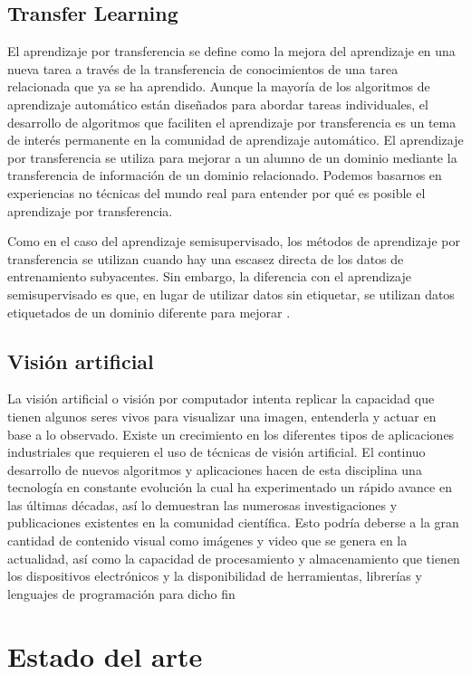 \section{Transfer Learning}
El aprendizaje por transferencia se define como la mejora del aprendizaje en una nueva tarea a través de la transferencia de conocimientos de una tarea relacionada que ya se ha aprendido. Aunque la mayoría de los algoritmos de aprendizaje automático están diseñados para abordar tareas individuales, el desarrollo de algoritmos que faciliten el aprendizaje por transferencia es un tema de interés permanente en la comunidad de aprendizaje automático. El aprendizaje por transferencia se utiliza para mejorar a un alumno de un dominio mediante la transferencia de información de un dominio relacionado. Podemos basarnos en experiencias no técnicas del mundo real para entender por qué es posible el aprendizaje por transferencia.

Como en el caso del aprendizaje semisupervisado, los métodos de aprendizaje por transferencia se utilizan cuando hay una escasez directa de los datos de entrenamiento subyacentes. Sin embargo, la diferencia con el aprendizaje semisupervisado es que, en lugar de utilizar datos sin etiquetar, se utilizan datos etiquetados de un dominio diferente para mejorar \cite{ref_14}.



\section{Visión artificial} La visión artificial o visión por computador intenta replicar la capacidad que tienen algunos seres vivos para visualizar una imagen, entenderla y actuar en base a lo observado. Existe un crecimiento en los diferentes tipos de aplicaciones industriales que requieren el uso de técnicas de visión artificial. El  continuo  desarrollo  de  nuevos  algoritmos  y  aplicaciones  hacen  de  esta  disciplina  una tecnología en constante evolución la cual ha experimentado un rápido avance en las últimas décadas, así lo demuestran las numerosas investigaciones y publicaciones existentes en la comunidad científica.  Esto podría deberse a la gran cantidad de contenido visual como imágenes y video que se genera en  la  actualidad,  así  como  la  capacidad  de  procesamiento  y  almacenamiento  que  tienen  los dispositivos electrónicos y la disponibilidad de herramientas, librerías y lenguajes de programación para dicho fin \cite{ref_15}

\chapter{Estado del arte}

